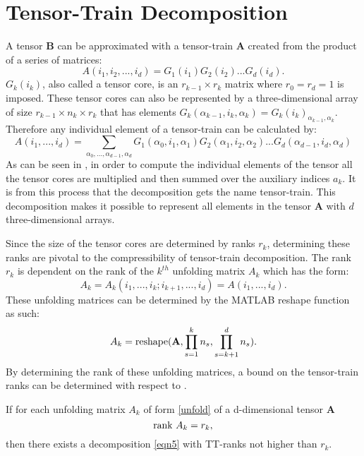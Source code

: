 \section{Tensor-Train Decomposition}
A tensor \textbf{B} can be approximated with a tensor-train \textbf{A} created from the product of a series of matrices:
\begin{equation}\label{tensaprox}
A(i_1,i_2,...,i_d) = G_1(i_1)G_2(i_2)...G_d(i_d).
\end{equation}
$G_k(i_k)$, also called a tensor core, is an $r_{k-1} \times r_k$ matrix where $r_0 = r_d=1$ is imposed. These tensor cores can also be represented by a three-dimensional array of size $r_{k-1} \times n_k \times r_k$ that has elements $G_k(\alpha_{k-1},i_k,\alpha_k)= G_k(i_k)_{\alpha_{k-1},\alpha_k}$. Therefore any individual element of a tensor-train can be calculated by:
\begin{equation}\label{eqn5}
A(i_1,...,i_d) = \sum_{\alpha_0,...,\alpha_{d-1},\alpha_d}G_1(\alpha_0,i_1,\alpha_1)G_2(\alpha_1,i_2,\alpha_2)...G_d(\alpha_{d-1},i_d,\alpha_d)
\end{equation}
As can be seen in , in order to compute the individual elements of the tensor all the tensor cores are multiplied and then summed over the auxiliary indices $a_k$. It is from this process that the decomposition gets the name tensor-train. This decomposition makes it possible to represent all elements in the tensor \textbf{A} with $d$ three-dimensional arrays.
 
Since the size of the tensor cores are determined by ranks $r_k$, determining these ranks are pivotal to the compressibility of tensor-train decomposition. The rank $r_k$ is dependent on the rank of the $k^{th}$ unfolding matrix $A_k$ which has the form:
\begin{equation}\label{unfold}
A_k = A_k(i_1,...,i_k;i_{k+1},...,i_d) = A(i_1,...,i_d).
\end{equation}
These unfolding matrices can be determined by the MATLAB reshape function as such:
\begin{equation*}
A_k = \textnormal{reshape} (\textbf{A},\prod_{s=1}^{k}n_s,\prod_{s=k+1}^{d}n_s).
\end{equation*}
By determining the rank of these unfolding matrices, a bound on the tensor-train ranks can be determined with respect to . \cite{Osel1}
\begin{theorem}\label{ttranks}
If for each unfolding matrix $A_k$ of form \ref{unfold} of a d-dimensional tensor \textbf{A}
\begin{equation*}
\textnormal{rank }A_k = r_k, 
\end{equation*}
then there exists a decomposition \ref{eqn5} with TT-ranks not higher than $r_k$.
\end{theorem}

